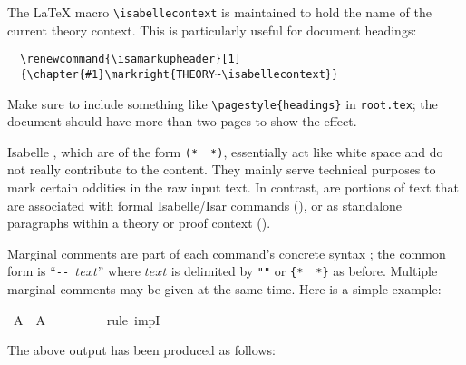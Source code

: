 \begin{isabellebody}
\begin{isamarkuptext}
  \medskip The {\LaTeX} macro \verb,\isabellecontext, is maintained to
  hold the name of the current theory context.  This is particularly
  useful for document headings:

\begin{verbatim}
  \renewcommand{\isamarkupheader}[1]
  {\chapter{#1}\markright{THEORY~\isabellecontext}}
\end{verbatim}

  \noindent Make sure to include something like
  \verb,\pagestyle{headings}, in \texttt{root.tex}; the document
  should have more than two pages to show the effect.%
\end{isamarkuptext}%
\isamarkuptrue%
%
\isamarkuptrue%
%
\begin{isamarkuptext}%
Isabelle , which are of the form
  \verb,(,\verb,*,~\isa{{\isasymdots}}~\verb,*,\verb,),, essentially act like
  white space and do not really contribute to the content.  They
  mainly serve technical purposes to mark certain oddities in the raw
  input text.  In contrast,  are portions of
  text that are associated with formal Isabelle/Isar commands
  (), or as standalone paragraphs within a
  theory or proof context ().

  \medskip Marginal comments are part of each command's concrete
  syntax \cite{isabelle-ref}; the common form is ``\verb,--,~$text$''
  where $text$ is delimited by \verb,",\isa{{\isasymdots}}\verb,", or
  \verb,{,\verb,*,~\isa{{\isasymdots}}~\verb,*,\verb,}, as before.  Multiple
  marginal comments may be given at the same time.  Here is a simple
  example:%
\end{isamarkuptext}%
\isamarkuptrue%
\ {\isachardoublequote}A\ {\isacharminus}{\isacharminus}{\isachargreater}\ A{\isachardoublequote}\isanewline
\ \ %
\isanewline
\ \ %
\isanewline
\ \ \isamarkupfalse%
\ {\isacharparenleft}rule\ impI{\isacharparenright}\ %
\isamarkupfalse%
%
\begin{isamarkuptext}%
\noindent The above output has been produced as follows:


\end{isamarkuptext}
\end{isabellebody}
